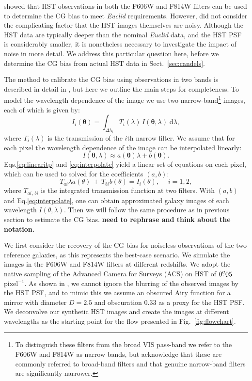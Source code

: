 \documentclass[useAMS,usenatbib]{mnras}
\renewcommand{\d}{\mathrm{d}}
\newcommand{\be}{\begin{equation}}
\newcommand{\ee}{\end{equation}}
\def\elabel#1{\label{eq:#1}}
\begin{document}
 showed that HST observations  in both the F606W and F814W filters can be used to determine the CG bias to meet {\it Euclid} requirements. However,  did not consider the complicating factor that the HST images themselves are noisy. Although the HST data are typically deeper than the nominal {\it Euclid} data, and the HST PSF is considerably smaller, it is nonetheless necessary to investigate the impact of noise in more detail. We address this particular question here, before we determine the CG bias from actual HST data in Sect.~\ref{sec:candels}.

The method to calibrate the CG bias using observations in two bands is described in detail
in , but here we outline the main steps for completeness. To model the
wavelength dependence of the image we use two narrow-band\footnote{To distinguish these filters from the broad VIS pass-band we refer to the F606W and F814W as narrow bands, but acknowledge that these are commonly referred to broad-band filters and that genuine narrow-band filters are significantly narrower.} images, each of which is given by:
%
\be
I_i({\bm\theta}) = \int_{\Delta \lambda_i} T_i(\lambda)\, I({\bm \theta},\lambda) \;\d \lambda,
\elabel{linearitp}
\ee
%
where $T_i(\lambda)$ is the transmission of the $i$th narrow filter. We assume that for each pixel the wavelength dependence of the image can be interpolated linearly:
%
\be
I({\bm \theta},\lambda) \approx a({\bm \theta})\lambda + b({\bm \theta}).
\elabel{interpolate}
\ee
%
Eqs.\ref{eq:linearitp} and \ref{eq:interpolate} yield a linear set of
equations on each pixel, which can be used to solved for the
coefficients $(a,b)$:
%
\be
T_{ai} \lambda a(\theta) \,+\,T_{bi} b(\theta) = I_i(\theta), \quad\; i=1,2,
\elabel{lineareq}
\ee
%
where $T_{ai,\,bi}$ is the integrated transmission function at two
filters. With $(a,b)$ and Eq.\ref{eq:interpolate}, one can obtain
approximated galaxy images of each wavelength
$I(\theta,\lambda)$. Then we will follow the same procedure as in
previous section to estimate the CG bias. {\bf need to rephrase and 
think about the notation.}

We first consider the recovery of the CG bias for noiseless observations of the two reference galaxies, as this represents the best-case scenario. We simulate the images in the F606W and F814W filters at different redshifts. We adopt the native sampling of the Advanced Camera for Surveys (ACS) on HST of  $0\hbox{$.\!\!^{\prime\prime}$}05$ pixel$^{-1}$. As shown in , we cannot ignore the blurring of the observed images by the HST PSF, and to mimic this we assume an obscured Airy function for a mirror with diameter $D=2.5$ and obscuration  $0.33$ as a proxy for the HST PSF. We deconvolve our synthetic HST images and create the images at different wavelengths as the starting point for the flow presented in Fig.~\ref{fig:flowchart}.
\end{document}
